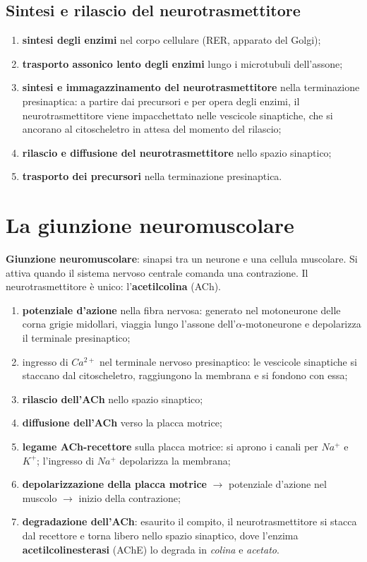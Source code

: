 \subsection{Sintesi e rilascio del neurotrasmettitore}

\begin{enumerate}
  \item \textbf{sintesi degli enzimi} nel corpo cellulare (RER, apparato del Golgi);
  \item \textbf{trasporto assonico lento degli enzimi} lungo i microtubuli dell'assone;
  \item \textbf{sintesi e immagazzinamento del neurotrasmettitore} nella terminazione presinaptica:
    a partire dai precursori e per opera degli enzimi, il neurotrasmettitore viene impacchettato
    nelle vescicole sinaptiche, che si ancorano al citoscheletro in attesa del momento del rilascio;
  \item \textbf{rilascio e diffusione del neurotrasmettitore} nello spazio sinaptico;
  \item \textbf{trasporto dei precursori} nella terminazione presinaptica.
\end{enumerate}

\section{La giunzione neuromuscolare}

\textbf{Giunzione neuromuscolare}: sinapsi tra un neurone e una cellula muscolare. Si attiva quando
il sistema nervoso centrale comanda una contrazione. Il neurotrasmettitore è unico:
l'\textbf{acetilcolina} (ACh).

\begin{enumerate}
  \item \textbf{potenziale d'azione} nella fibra nervosa: generato nel motoneurone delle corna
    grigie midollari, viaggia lungo l'assone dell'$\alpha$-motoneurone e depolarizza il terminale
    presinaptico;
  \item ingresso di \textbf{$Ca^{2+}$} nel terminale nervoso presinaptico: le vescicole sinaptiche
    si staccano dal citoscheletro, raggiungono la membrana e si fondono con essa;
  \item \textbf{rilascio dell'ACh} nello spazio sinaptico;
  \item \textbf{diffusione dell'ACh} verso la placca motrice;
  \item \textbf{legame ACh-recettore} sulla placca motrice: si aprono i canali per $Na^+$ e $K^+$;
    l'ingresso di $Na^+$ depolarizza la membrana;
  \item \textbf{depolarizzazione della placca motrice} $\rightarrow$ potenziale d'azione nel
    muscolo $\rightarrow$ inizio della contrazione;
  \item \textbf{degradazione dell'ACh}: esaurito il compito, il neurotrasmettitore si stacca dal
    recettore e torna libero nello spazio sinaptico, dove l'enzima \textbf{acetilcolinesterasi}
    (AChE) lo degrada in \textit{colina} e \textit{acetato}.
\end{enumerate}


